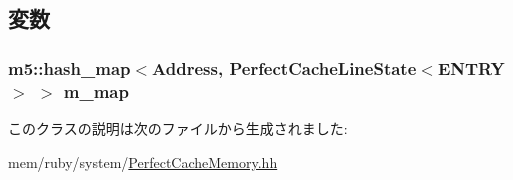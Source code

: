 \subsection{変数}
\hypertarget{classPerfectCacheMemory_a9c43d7a42d7d83abf0d764a1de886104}{
\subsubsection[{m\_\-map}]{\setlength{\rightskip}{0pt plus 5cm}m5::hash\_\-map$<${\bf Address}, {\bf PerfectCacheLineState}$<$ENTRY$>$ $>$ {\bf m\_\-map}}}
\label{classPerfectCacheMemory_a9c43d7a42d7d83abf0d764a1de886104}


このクラスの説明は次のファイルから生成されました:\begin{DoxyCompactItemize}
\item 
mem/ruby/system/\hyperlink{PerfectCacheMemory_8hh}{PerfectCacheMemory.hh}\end{DoxyCompactItemize}
